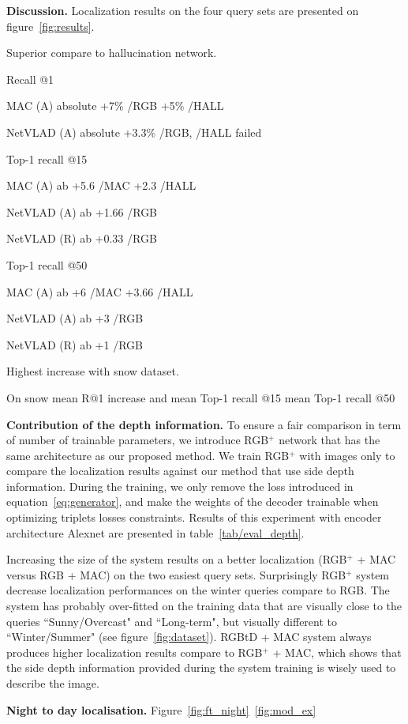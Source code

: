\noindent\textbf{Discussion.} Localization results on the four query sets are presented on figure~\ref{fig:results}. 

Superior compare to hallucination network.

Recall @1

MAC (A) absolute +7\% /RGB +5\% /HALL

NetVLAD (A) absolute +3.3\% /RGB, /HALL failed

Top-1 recall @15

MAC (A) ab +5.6 /MAC +2.3 /HALL

NetVLAD (A) ab +1.66 /RGB

NetVLAD (R) ab +0.33 /RGB

Top-1 recall @50

MAC (A) ab +6 /MAC +3.66 /HALL

NetVLAD (A) ab +3 /RGB

NetVLAD (R) ab +1 /RGB

Highest increase with snow dataset.

On snow mean R@1 increase and mean Top-1 recall @15 mean Top-1 recall @50 

\noindent\textbf{Contribution of the depth information.} To ensure a fair comparison in term of number of trainable parameters, we introduce RGB$^+$ network that has the same architecture as our proposed method. We train RGB$^+$ with images only to compare the localization results against our method that use side depth information. During the training, we only remove the loss introduced in equation~\ref{eq:generator}, and make the weights of the decoder trainable when optimizing triplets losses constraints. Results of this experiment with encoder architecture Alexnet are presented in table~\ref{tab/eval_depth}.



Increasing the size of the system results on a better localization (RGB$^{+}$ + MAC versus RGB + MAC) on the two easiest query sets. Surprisingly RGB$^{+}$ system decrease localization performances on the winter queries compare to RGB. The system has probably over-fitted on the training data that are visually close to the queries ``Sunny/Overcast" and ``Long-term", but visually different to ``Winter/Summer" (see figure~\ref{fig:dataset}). RGBtD + MAC system always produces higher localization results compare to RGB$^{+}$ + MAC, which shows that the side depth information provided during the system training is wisely used to describe the image. 

\noindent\textbf{Night to day localisation.} Figure~\ref{fig:ft_night}~\ref{fig:mod_ex}

